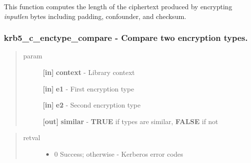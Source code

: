 \documentclass[letterpaper,10pt,english]{sphinxmanual}
\begin{document}
This function computes the length of the ciphertext produced by encrypting \emph{inputlen} bytes including padding, confounder, and checksum.


\subsubsection{krb5\_c\_enctype\_compare -  Compare two encryption types.}
\label{appdev/refs/api/krb5_c_enctype_compare::doc}\label{appdev/refs/api/krb5_c_enctype_compare:krb5-c-enctype-compare-compare-two-encryption-types}

\begin{fulllineitems}
\label{appdev/refs/api/krb5_c_enctype_compare:krb5_c_enctype_compare}
\end{fulllineitems}

\begin{quote}\begin{description}
\item[{param}] \leavevmode
\textbf{{[}in{]}} \textbf{context} - Library context

\textbf{{[}in{]}} \textbf{e1} - First encryption type

\textbf{{[}in{]}} \textbf{e2} - Second encryption type

\textbf{{[}out{]}} \textbf{similar} - \textbf{TRUE} if types are similar, \textbf{FALSE} if not

\end{description}\end{quote}
\begin{quote}\begin{description}
\item[{retval}] \leavevmode\begin{itemize}
\item {} 
0   Success; otherwise - Kerberos error codes

\end{itemize}

\end{description}\end{quote}
\end{document}

